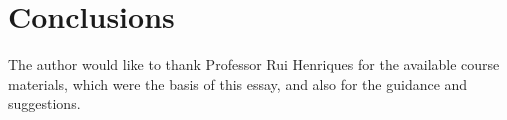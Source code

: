 \section{Conclusions}






\begin{acks}
  The author would like to thank Professor Rui Henriques for the available course materials, which were the basis of this essay, and also for the guidance and suggestions.

\end{acks}
